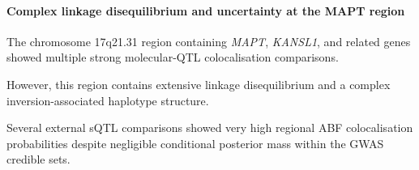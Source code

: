\documentclass[11pt,a4paper]{article}
\begin{document}
\begin{table}[t]
\centering
\caption{Representative external molecular-QTL
colocalisation findings integrated with GWAS
credible-set variants. PIP denotes the GWAS
posterior inclusion probability. CS mass denotes
conditional H4 variant-posterior mass within
the GWAS credible set. These results represent
associations rather than experimentally
validated causal mechanisms.}
\label{tab:integrated_variant_qtl}
\footnotesize
{}
\end{table}


\paragraph{Complex linkage disequilibrium and
uncertainty at the MAPT region}

The chromosome 17q21.31 region containing
\textit{MAPT}, \textit{KANSL1}, and related
genes showed multiple strong molecular-QTL
colocalisation comparisons.

However, this region contains extensive
linkage disequilibrium and a complex
inversion-associated haplotype structure.

Several external sQTL comparisons showed
very high regional ABF colocalisation
probabilities despite negligible conditional
posterior mass within the GWAS credible sets.
\end{document}
